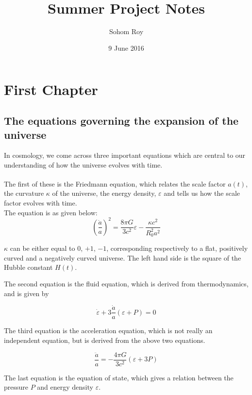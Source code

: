 \documentclass[a4,10pt,twoside]{report}
\begin{document}
	\title{Summer Project Notes}
	\date{9 June 2016}
	\author{Sohom Roy}
	\maketitle
	
	
	\tableofcontents

	
	\chapter{First Chapter}
	\section{The equations governing the expansion of the universe}
	
	In cosmology, we come across three important equations which are central to our understanding of how the universe evolves with time.\\ \\
	The first of these is the Friedmann equation, which relates the scale factor $a(t)$, the curvature $\kappa$ of the universe, the energy density, $\varepsilon$ and tells us how the scale factor evolves with time.\\
	
	The equation is as given below:
	\begin{equation}
	\left(\frac{\dot{a}}{a}\right)^2=\frac{8\pi G}{3c^2}\varepsilon-\frac{\kappa c^2}{R_0^2a^2}
	\end{equation}
	
	$\kappa$ can be either equal to $0$, $+1$, $-1$, corresponding respectively to a flat, positively curved and a negatively curved universe.
	The left hand side is the square of the Hubble constant $H(t)$.
	
	The second equation is the fluid equation, which is derived from thermodynamics, and is given by
	
	\begin{equation}
		\dot{\varepsilon}+3\frac{\dot{a}}{a}(\varepsilon+P)=0
	\end{equation}
	
	The third equation is the acceleration equation, which is not really an independent equation, but is derived from the above two equations.
	
	\begin{equation}
		\frac{\ddot{a}}{a}=-\frac{4\pi G}{3c^2}(\varepsilon+3P)
	\end{equation}
	
	The last equation is the equation of state, which gives a relation between the pressure $P$ and energy density $\varepsilon$.
	
\end{document}
